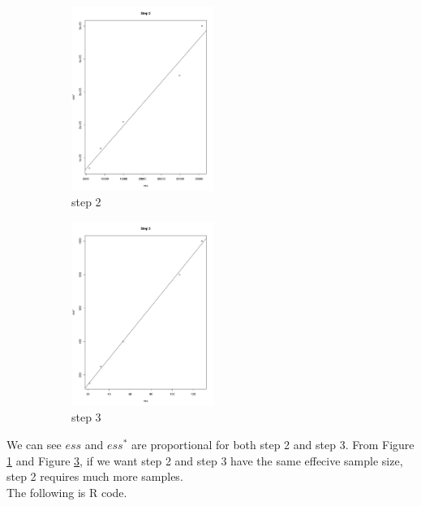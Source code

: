 \documentclass[11pt,english]{article}
\newcommand{\reffig}[1]{Figure \ref{#1}\hspace{2pt}}
\begin{document}
\begin{figure}[H]
	\centering
	\begin{subfigure}[b]{0.475\textwidth}
		\centering
		\includegraphics[width=\textwidth, height=6cm]{p1_2.pdf}
		\caption{step 2}\label{p1_2}
	\end{subfigure}
	\quad
	\begin{subfigure}[b]{0.475\textwidth}
		\centering
		\includegraphics[width=\textwidth, height=6cm]{p1_3.pdf}
		\caption{step 3}\label{p1_3}
	\end{subfigure}
	\caption{}
\end{figure}
We can see $ess$ and $ess^*$ are proportional for both step 2 and step 3.  From \reffig{p1_2} and \reffig{p1_3}, if we want step 2 and step 3 have the same effecive sample size, step 2 requires much more samples.\\
The following is R code.\\
\end{document}

